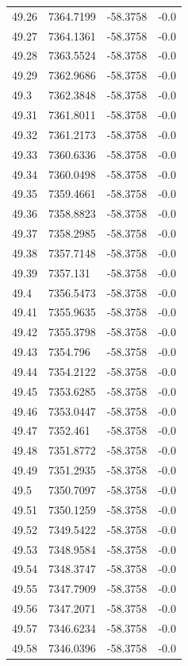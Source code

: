 \begin{table}[H]
\begin{tabular}{llll}
49.26 & 7364.7199 & -58.3758 & -0.0 \\
49.27 & 7364.1361 & -58.3758 & -0.0 \\
49.28 & 7363.5524 & -58.3758 & -0.0 \\
49.29 & 7362.9686 & -58.3758 & -0.0 \\
49.3 & 7362.3848 & -58.3758 & -0.0 \\
49.31 & 7361.8011 & -58.3758 & -0.0 \\
49.32 & 7361.2173 & -58.3758 & -0.0 \\
49.33 & 7360.6336 & -58.3758 & -0.0 \\
49.34 & 7360.0498 & -58.3758 & -0.0 \\
49.35 & 7359.4661 & -58.3758 & -0.0 \\
49.36 & 7358.8823 & -58.3758 & -0.0 \\
49.37 & 7358.2985 & -58.3758 & -0.0 \\
49.38 & 7357.7148 & -58.3758 & -0.0 \\
49.39 & 7357.131 & -58.3758 & -0.0 \\
49.4 & 7356.5473 & -58.3758 & -0.0 \\
49.41 & 7355.9635 & -58.3758 & -0.0 \\
49.42 & 7355.3798 & -58.3758 & -0.0 \\
49.43 & 7354.796 & -58.3758 & -0.0 \\
49.44 & 7354.2122 & -58.3758 & -0.0 \\
49.45 & 7353.6285 & -58.3758 & -0.0 \\
49.46 & 7353.0447 & -58.3758 & -0.0 \\
49.47 & 7352.461 & -58.3758 & -0.0 \\
49.48 & 7351.8772 & -58.3758 & -0.0 \\
49.49 & 7351.2935 & -58.3758 & -0.0 \\
49.5 & 7350.7097 & -58.3758 & -0.0 \\
49.51 & 7350.1259 & -58.3758 & -0.0 \\
49.52 & 7349.5422 & -58.3758 & -0.0 \\
49.53 & 7348.9584 & -58.3758 & -0.0 \\
49.54 & 7348.3747 & -58.3758 & -0.0 \\
49.55 & 7347.7909 & -58.3758 & -0.0 \\
49.56 & 7347.2071 & -58.3758 & -0.0 \\
49.57 & 7346.6234 & -58.3758 & -0.0 \\
49.58 & 7346.0396 & -58.3758 & -0.0 \\

\end{tabular}
\end{table}
